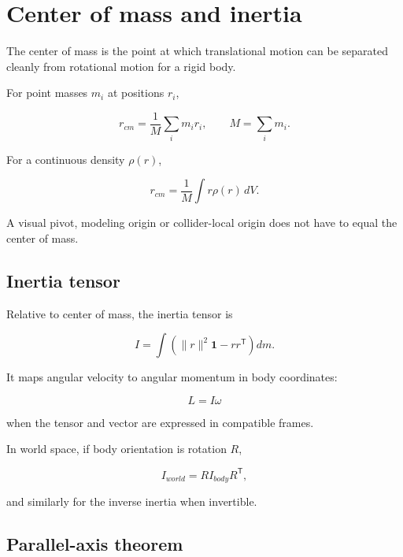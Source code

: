 \hypertarget{appendix-66742099f8a0}{}\label{referencestart:appendix-66742099f8a0}
\section{Center of mass and inertia}\label{appendix-66742099f8a0-center-of-mass-and-inertia}

\hypertarget{appendix-66742099f8a0-center-of-mass-and-inertia}{}

The center of mass is the point at which translational motion can be separated cleanly from rotational motion for a rigid body.

For point masses \(m_i\) at positions \(r_i\),

\[
r_{cm}=\frac{1}{M}\sum_i m_i r_i,
\qquad
M=\sum_i m_i.
\]

For a continuous density \(\rho(r)\),

\[
r_{cm}=\frac{1}{M}\int r\rho(r)\,dV.
\]

A visual pivot, modeling origin or collider-local origin does not have to equal the center of mass.

\subsection{Inertia tensor}\label{appendix-66742099f8a0-inertia-tensor}

\hypertarget{appendix-66742099f8a0-inertia-tensor}{}

Relative to center of mass, the inertia tensor is

\[
I=
\int
\left(
\|r\|^2\mathbf{1}-rr^{\mathsf T}
\right)dm.
\]

It maps angular velocity to angular momentum in body coordinates:

\[
L=I\omega
\]

when the tensor and vector are expressed in compatible frames.

In world space, if body orientation is rotation \(R\),

\[
I_{world}=RI_{body}R^{\mathsf T},
\]

and similarly for the inverse inertia when invertible.

\subsection{Parallel-axis theorem}\label{appendix-66742099f8a0-parallel-axis-theorem}

\hypertarget{appendix-66742099f8a0-parallel-axis-theorem}{}


